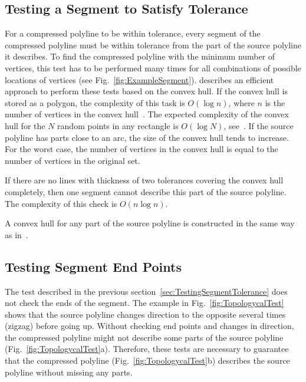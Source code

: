 \documentclass[conference]{IEEEtran}
\begin{document}
\subsection
{
  Testing a Segment to Satisfy Tolerance
  \label{sec:TestingSegmentTolerance}
}

For a compressed polyline to be within tolerance, every segment of the compressed polyline must be within tolerance from the part of the source polyline it describes. To find the compressed polyline with the minimum number of vertices, this test has to be performed many times for all combinations of possible locations of vertices (see Fig.~\ref{fig:ExampleSegment}). \cite{OptimizedCompressionAlgorithm} describes an efficient approach to perform these tests based on the convex hull. If the convex hull is stored as a polygon, the complexity of this task is $O{\left( \log{n} \right)}$, where $n$ is the number of vertices in the convex hull~\cite{OptimizedCompressionAlgorithm}. The expected complexity of the convex hull for the $N$ random points in any rectangle is $O{\left( \log{N} \right)}$, see~\cite{ConvexHullsComplexity}. If the source polyline has parts close to an arc, the size of the convex hull tends to increase. For the worst case, the number of vertices in the convex hull is equal to the number of vertices in the original set.

If there are no lines with thickness of two tolerances covering the convex hull completely, then one segment cannot describe this part of the source polyline. The complexity of this check is $O{\left( n \log{n} \right)}$.

A convex hull for any part of the source polyline is constructed in the same way as in~\cite{OptimizedCompressionAlgorithm}.

\subsection
{
  Testing Segment End Points
  \label{sec:TestingSegmentEndPoints}
}

The test described in the previous section~\ref{sec:TestingSegmentTolerance} does not check the ends of the segment. The example in Fig.~\ref{fig:TopologycalTest} shows that the source polyline changes direction to the opposite several times (zigzag) before going up. Without checking end points and changes in direction, the compressed polyline might not describe some parts of the source polyline (Fig.~\ref{fig:TopologycalTest}a). Therefore, these tests are necessary to guarantee that the compressed polyline (Fig.~\ref{fig:TopologycalTest}b) describes the source polyline without missing any parts.
\end{document}
